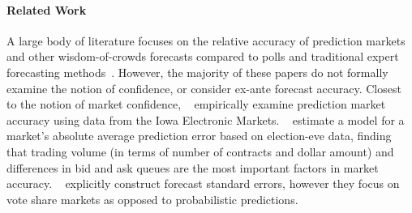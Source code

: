 \documentclass[sigconf,anonymous]{aamas}   %
\newcommand{\rupert}[1]{\ifnum\Chatty=1 \textcolor{red}   {Rupert: [#1]} \fi}
\begin{document}


\paragraph{Related Work} 
A large body of literature focuses on the relative accuracy of prediction markets and other wisdom-of-crowds forecasts compared to polls and traditional expert forecasting methods~\cite{wolfers2004prediction,wolfers2006prediction,erikson2008political,goel2010prediction, rothschild2015combining}. 
However, the majority of these papers do not formally examine the notion of confidence, or consider ex-ante forecast accuracy.
Closest to the notion of market confidence, \citeauthor{berg1997makes}~\cite{berg1997makes,berg2003accuracy} empirically examine prediction market accuracy using data from the Iowa Electronic Markets. \citeauthor{berg1997makes}~\cite{berg1997makes} estimate a model for a market's absolute average prediction error based on election-eve data, finding that trading volume (in terms of number of contracts and dollar amount) and differences in bid and ask queues are the most important factors in market accuracy. 
\citeauthor{berg2003accuracy}~\cite{berg2003accuracy} explicitly construct forecast standard errors, however they focus on vote share markets as opposed to probabilistic predictions. 
\end{document}
